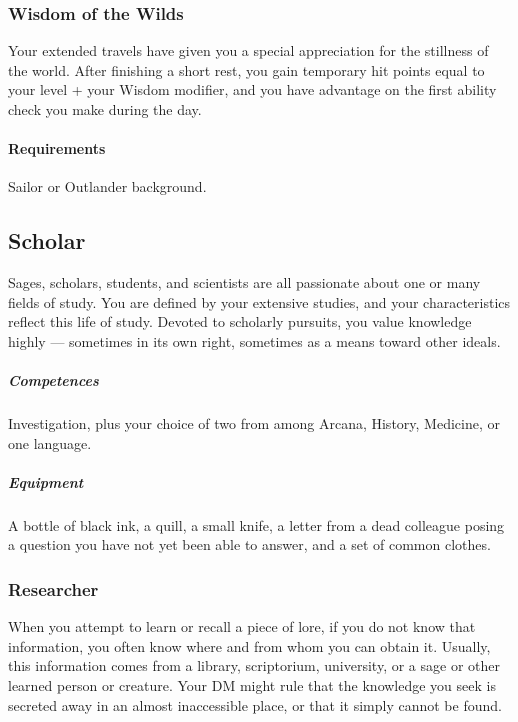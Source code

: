         \subsubsection{Wisdom of the Wilds} \label{feat::wisdomofthewilds}
            Your extended travels have given you a special appreciation for the stillness of the world.
            After finishing a short rest, you gain temporary hit points equal to your level + your Wisdom modifier, and you have advantage on the first ability check you make during the day.
            \paragraph{Requirements} Sailor or Outlander background.
\subsection*{Scholar} \label{ssec::scholar}
    Sages, scholars, students, and scientists are all passionate about one or many fields of study.
    You are defined by your extensive studies, and your characteristics reflect this life of study.
    Devoted to scholarly pursuits, you value knowledge highly --- sometimes in its own right, sometimes as a means toward other ideals.

    \subparagraph{Competences} Investigation, plus your choice of two from among Arcana, History, Medicine, or one language.

    \subparagraph{Equipment} A bottle of black ink, a quill, a small knife, a letter from a dead colleague posing a question you have not yet been able to answer, and a set of common clothes.

    \subsubsection{Researcher} \label{feat::researcher}
        When you attempt to learn or recall a piece of lore, if you do not know that information, you often know where and from whom you can obtain it.
        Usually, this information comes from a library, scriptorium, university, or a sage or other learned person or creature.
        Your DM might rule that the knowledge you seek is secreted away in an almost inaccessible place, or that it simply cannot be found.

